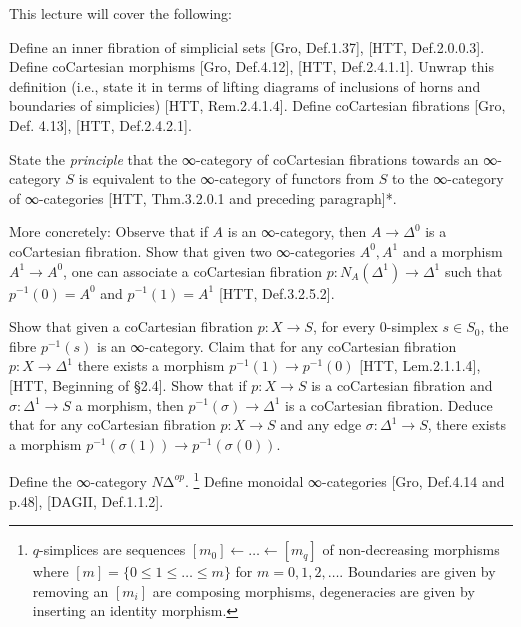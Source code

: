 \documentclass[a4paper]{amsart}
\numberwithin{figure}{section}
\theoremstyle{theorem}
\theoremstyle{definition}
\begin{document}

This lecture will cover the following:

Define an inner fibration of simplicial sets [Gro, Def.1.37], [HTT, Def.2.0.0.3]. %
Define coCartesian morphisms [Gro, Def.4.12], [HTT, Def.2.4.1.1]. %
Unwrap this definition (i.e., state it in terms of lifting diagrams of inclusions of horns and boundaries of simplicies) [HTT, Rem.2.4.1.4]. %
Define coCartesian fibrations [Gro, Def. 4.13], [HTT, Def.2.4.2.1]. %

State the \emph{principle} that the ∞-category of coCartesian fibrations towards an ∞-category $S$ is equivalent to the ∞-category of functors from $S$ to the ∞-category of ∞-categories [HTT, Thm.3.2.0.1 and preceding paragraph]*. %

More concretely: %
Observe that if $A$ is an ∞-category, then $A {\to} \Delta^0$ is a coCartesian fibration. %
Show that given two ∞-categories $A^{0}, A^{1}$ and a morphism $A^{1} \to A^{0}$, one can associate a coCartesian fibration $p: N_A(\Delta^1) \to \Delta^1$ such that $p^{-1}(0) = A^0$ and $p^{-1}(1) = A^1$ [HTT, Def.3.2.5.2]. %

Show that given a coCartesian fibration $p: X {\to} S$, for every 0-simplex $s \in S_0$, the fibre $p^{-1}(s)$ is an ∞-category. %
Claim that for any coCartesian fibration $p: X {\to} \Delta^1$ there exists a morphism $p^{-1}(1) \to p^{-1}(0)$ [HTT, Lem.2.1.1.4], [HTT, Beginning of §2.4]. %
Show that if $p: X{\to}S$ is a coCartesian fibration and $\sigma: \Delta^1 {\to}S$ a morphism, then $p^{-1}(\sigma) \to \Delta^1$ is a coCartesian fibration. %
Deduce that for any coCartesian fibration $p: X \to S$ and any edge $\sigma: \Delta^1 \to S$, there exists a morphism $p^{-1}(\sigma(1)) \to p^{-1}(\sigma(0))$. %

Define the ∞-category $N∆^{op}$.%
\footnote{$q$-simplices are sequences $[m_0] {\leftarrow} \dots {\leftarrow} [m_q]$ of non-decreasing morphisms where $[m]  = \{0 \leq 1 \leq \dots \leq m \}$ for $m = 0, 1, 2, \dots$. Boundaries are given by removing an $[m_i]$ are composing morphisms, degeneracies are given by inserting an identity morphism.} %
Define monoidal ∞-categories [Gro, Def.4.14 and p.48], [DAGII, Def.1.1.2]. %
\end{document}
